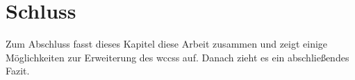 \chapter{Schluss}
    \label{chapter:SummaryAndOutlook}
    Zum Abschluss fasst dieses Kapitel diese Arbeit zusammen
    und zeigt einige Möglichkeiten zur Erweiterung des \glspl{wccs} auf.
    Danach zieht es ein abschließendes Fazit.

    
    
    